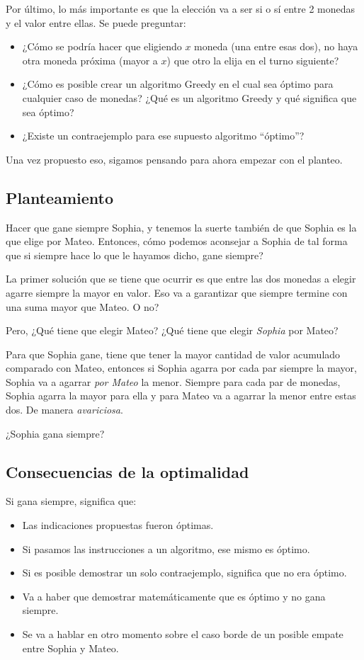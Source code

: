 \vspace{0.425cm}
Por último, lo más importante es que la elección va a ser si o sí entre 2 monedas y el valor entre ellas. Se puede preguntar:
\begin{itemize}
    \item ¿Cómo se podría hacer que eligiendo $x$ moneda (una entre esas dos), no haya otra moneda próxima (mayor a $x$) que otro la elija en el turno siguiente? 
    \item ¿Cómo es posible crear un algoritmo Greedy en el cual sea óptimo para cualquier caso de monedas? ¿Qué es un algoritmo Greedy y qué significa que sea óptimo?
    \item ¿Existe un contraejemplo para ese supuesto algoritmo ``óptimo''?
\end{itemize}
Una vez propuesto eso, sigamos pensando para ahora empezar con el planteo.

\subsection{Planteamiento}

Hacer que gane siempre Sophia, y tenemos la suerte también de que Sophia es la que elige por Mateo. Entonces, cómo podemos aconsejar a Sophia de tal forma que si siempre hace lo que le hayamos dicho, gane siempre?

La primer solución que se tiene que ocurrir es que entre las dos monedas a elegir agarre siempre la mayor en valor. Eso va a garantizar que siempre termine con una suma mayor que Mateo. O no?

Pero, ¿Qué tiene que elegir Mateo? ¿Qué tiene que elegir \textit{Sophia} por Mateo?

Para que Sophia gane, tiene que tener la mayor cantidad de valor acumulado comparado con Mateo, entonces si Sophia agarra por cada par siempre la mayor, Sophia va a agarrar \textit{por Mateo} la menor. Siempre para cada par de monedas, Sophia agarra la mayor para ella y para Mateo va a agarrar la menor entre estas dos.
De manera \textit{avariciosa}.

¿Sophia gana siempre?

\subsection{Consecuencias de la optimalidad}

Si gana siempre, significa que:

\begin{itemize}
    \item Las indicaciones propuestas fueron óptimas.
    \item Si pasamos las instrucciones a un algoritmo, ese mismo es óptimo.
    \item Si es posible demostrar un solo contraejemplo, significa que no era óptimo.
    \item Va a haber que demostrar matemáticamente que es óptimo y no gana siempre.
    \item Se va a hablar en otro momento sobre el caso borde de un posible empate entre Sophia y Mateo.
\end{itemize}


